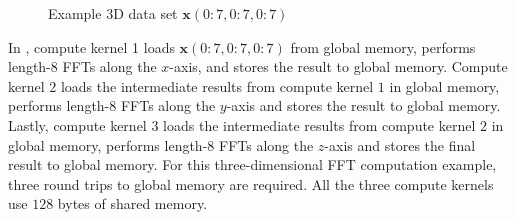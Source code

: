 \documentclass[11pt, onecolumn, journal,compsoc]{IEEEtran}
\newcounter{pgfcurrentmatrix}
\theoremstyle{problemstyle}
\begin{document}
\begin{figure}[H]
  
  \caption{Example 3D data set $\bm{x}(0 \colon 7,0 \colon 7,0 \colon 7)$}
  \label{fig:example_data_set_2}
  \end{figure}

  In , compute kernel 1 loads $\bm{x}(0 \colon 7,0 \colon 7,0 \colon 7)$ from global memory, performs length-$8$ FFTs along the $x$-axis, and stores the result to global memory. Compute kernel $2$ loads the intermediate results from compute kernel $1$ in global memory, performs length-$8$ FFTs along the $y$-axis and stores the result to global memory. Lastly, compute kernel $3$ loads the intermediate results from compute kernel $2$ in global memory, performs length-$8$ FFTs along the $z$-axis and stores the final result to global memory. For this three-dimensional FFT computation example, three round trips to global memory are required. All the three compute kernels use $128$ bytes of shared memory.
\end{document}
